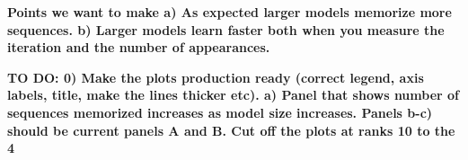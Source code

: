 \documentclass{article}
\theoremstyle{plain}
\theoremstyle{definition}
\theoremstyle{remark}
\begin{document}


\textbf{Points we want to make a) As expected larger models memorize more sequences. b) Larger models learn faster both when you measure the iteration and the number of appearances.}

\textbf{TO DO: 0) Make the plots production ready (correct legend, axis labels, title, make the lines thicker etc). a) Panel that shows number of sequences memorized increases as model size increases. Panels b-c) should be current panels A and B. Cut off the plots at ranks 10 to the 4}
\end{document}
